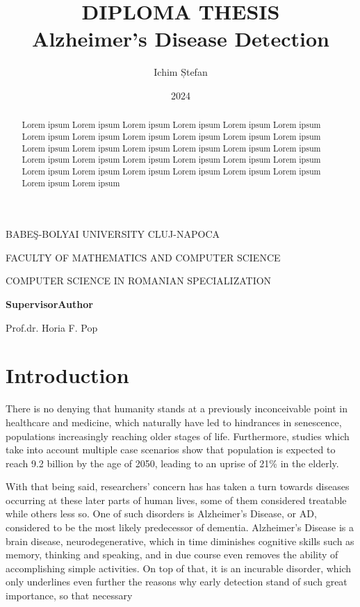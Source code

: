\documentclass[a4paper, 12pt]{article}
\title{
    DIPLOMA THESIS \\
    Alzheimer's Disease Detection
}
\author{Ichim Ștefan}
\date{2024}
\makeatletter
\renewcommand{\maketitle}{
    \begin{center}
            \normalsize{BABEŞ-BOLYAI UNIVERSITY CLUJ-NAPOCA}\par %
            \normalsize{FACULTY OF MATHEMATICS AND COMPUTER SCIENCE}\par %
            \normalsize{COMPUTER SCIENCE IN ROMANIAN SPECIALIZATION}\par
        \vspace{21em} %

        {\LARGE\@title\par} %
        \vspace{21em} %

        \textbf{Supervisor}\hspace{20em}\textbf{Author}\par
        Prof.dr. Horia F. Pop\hspace{16em}{\large\@author\par} %
        \vspace{3em} %

        {\large\@date\par} %
    \end{center}
}
\makeatother
\begin{document}
\maketitle
\newpage

\begin{abstract}
    Lorem ipsum Lorem ipsum Lorem ipsum Lorem ipsum
    Lorem ipsum Lorem ipsum Lorem ipsum Lorem ipsum
    Lorem ipsum Lorem ipsum Lorem ipsum Lorem ipsum
    Lorem ipsum Lorem ipsum Lorem ipsum Lorem ipsum
    Lorem ipsum Lorem ipsum Lorem ipsum Lorem ipsum
    Lorem ipsum Lorem ipsum Lorem ipsum Lorem ipsum
    Lorem ipsum Lorem ipsum Lorem ipsum Lorem ipsum
    Lorem ipsum Lorem ipsum Lorem ipsum Lorem ipsum
\end{abstract}
\newpage

\tableofcontents
\newpage

\section{Introduction}
There is no denying that humanity stands at a previously inconceivable point in healthcare and medicine,
which naturally have led to hindrances in senescence, populations increasingly reaching older stages of life.
Furthermore, studies which take into account multiple case scenarios show that population is expected to reach
9.2 billion by the age of 2050, leading to an uprise of 21\% in the elderly. \cite{KC2017181}

With that being said, researchers' concern has has taken a turn towards diseases occurring at these later
parts of human lives, some of them considered treatable while others less so. One of such disorders is
Alzheimer's Disease, or AD, considered to be the most likely predecessor of dementia. Alzheimer's Disease
is a brain disease, neurodegenerative, which in time diminishes cognitive skills such as memory, thinking
and speaking, and in due course even removes the ability of accomplishing simple activities.
On top of that, it is an incurable disorder, which only underlines even further the reasons why early
detection stand of such great importance, so that necessary

\newpage



\end{document}

